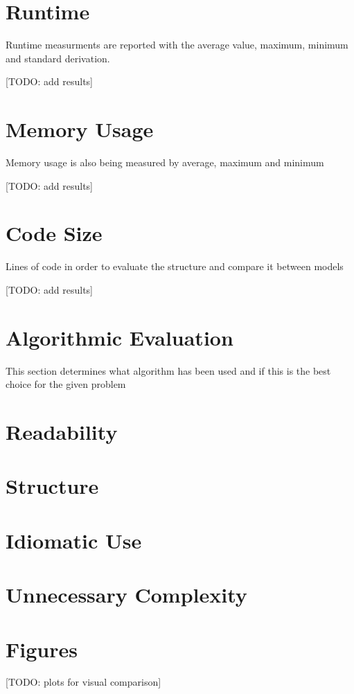 \documentclass[12pt,a4paper]{report}
\begin{document}
\section{Runtime}
Runtime measurments are reported with the average value, maximum, minimum and standard derivation.

[TODO: add results]

\section{Memory Usage}
Memory usage is also being measured by average, maximum and minimum

[TODO: add results]

\section{Code Size}
Lines of code in order to evaluate the structure and compare it between models

[TODO: add results]

\section{Algorithmic Evaluation}
This section determines what algorithm has been used and if this is the best choice for the given problem

\section{Readability}

\section{Structure}

\section{Idiomatic Use}

\section{Unnecessary Complexity}




\section{Figures}
[TODO: plots for visual comparison]
\end{document}
